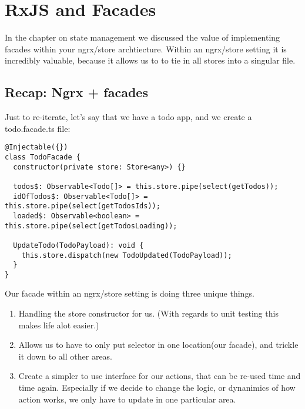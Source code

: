 \chapter{ RxJS and Facades }
In the chapter on state management we discussed the value of implementing facades within your ngrx/store archtiecture. Within an ngrx/store setting it is incredibly valuable, because it allows us to to tie in all stores into a singular file. 

\section{Recap: Ngrx + facades}
Just to re-iterate, let's say that we have a todo app, and we create a todo.facade.ts file:

\begin{lstlisting}[caption=todo.facade.ts]
@Injectable({})
class TodoFacade {
  constructor(private store: Store<any>) {}

  todos$: Observable<Todo[]> = this.store.pipe(select(getTodos));
  idOfTodos$: Observable<Todo[]> = this.store.pipe(select(getTodosIds));
  loaded$: Observable<boolean> = this.store.pipe(select(getTodosLoading));

  UpdateTodo(TodoPayload): void {
    this.store.dispatch(new TodoUpdated(TodoPayload));
  }
}  
\end{lstlisting}

Our facade within an ngrx/store setting is doing three unique things.
\begin{enumerate}
  \item Handling the store constructor for us. (With regards to unit testing this makes life alot easier.)
  \item Allows us to have to only put selector in one location(our facade), and trickle it down to all other areas. 
  \item Create a simpler to use interface for our actions, that can be re-used time and time again. Especially if we decide to change the logic, or dynanimics of how action works, we only have to update in one particular area. 
\end{enumerate}

